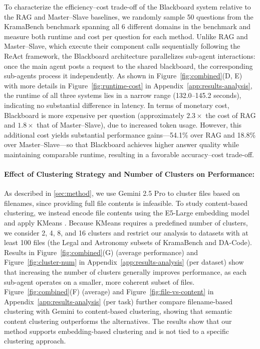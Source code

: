 To characterize the efficiency–cost trade-off of the Blackboard system relative to the RAG and Master–Slave baselines, we randomly sample 50 questions from the KramaBench benchmark spanning all 6 different domains in the benchmark and measure both runtime and cost per question for each method. Unlike RAG and Master–Slave, which execute their component calls sequentially following the ReAct framework, the Blackboard architecture parallelizes sub-agent interactions: once the main agent posts a request to the shared blackboard, the corresponding sub-agents process it independently. As shown in Figure~\ref{fig:combined}(D, E) with more details in Figure~\ref{fig:runtime-cost} in Appendix~\ref{app:results-analysis}, the runtime of all three systems lies in a narrow range (132.0--145.2 seconds), indicating no substantial difference in latency. In terms of monetary cost, Blackboard is more expensive per question (approximately $2.3\times$ the cost of RAG and $1.8\times$ that of Master–Slave), due to increased token usage. However, this additional cost yields substantial performance gains—54.1\% over RAG and 18.8\% over Master–Slave—so that Blackboard achieves higher answer quality while maintaining comparable runtime, resulting in a favorable accuracy–cost trade-off.



\paragraph{Effect of Clustering Strategy and Number of Clusters on Performance:}

As described in \textsection\ref{sec:method}, we use Gemini 2.5 Pro to cluster files based on filenames, since providing full file contents is infeasible. To study content-based clustering, we instead encode file contents using the E5-Large embedding model and apply KMeans \citep{Lloyd1982LeastSQ}. Because KMeans requires a predefined number of clusters, we consider 2, 4, 8, and 16 clusters and restrict our analysis to datasets with at least 100 files (the Legal and Astronomy subsets of KramaBench and DA-Code). Results in Figure~\ref{fig:combined}(G) (average performance) and Figure~\ref{fig:cluster-num} in Appendix~\ref{app:results-analysis} (per dataset) show that increasing the number of clusters generally improves performance, as each sub-agent operates on a smaller, more coherent subset of files. Figure~\ref{fig:combined}(F) (average) and Figure~\ref{fig:file-vs-content} in Appendix~\ref{app:results-analysis} (per task) further compare filename-based clustering with Gemini to content-based clustering, showing that semantic content clustering outperforms the alternatives. The results show that our method supports embedding-based clustering and is not tied to a specific clustering approach.

